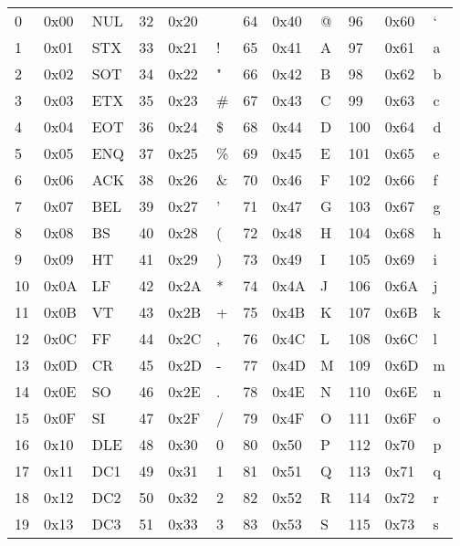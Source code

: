 \documentclass{book}
\begin{document}
{\begin{tabular}{|lll|lll|lll|lll|}
    0 &  0x00 &  NUL &   32 &  0x20 &      &   64 &  0x40 &    @ &   96 &  0x60 &    ` \\
    1 &  0x01 &  STX &   33 &  0x21 &    ! &   65 &  0x41 &    A &   97 &  0x61 &    a \\
    2 &  0x02 &  SOT &   34 &  0x22 &    " &   66 &  0x42 &    B &   98 &  0x62 &    b \\
    3 &  0x03 &  ETX &   35 &  0x23 &   \# &   67 &  0x43 &    C &   99 &  0x63 &    c \\
    4 &  0x04 &  EOT &   36 &  0x24 &   \$ &   68 &  0x44 &    D &  100 &  0x64 &    d \\
    5 &  0x05 &  ENQ &   37 &  0x25 &   \% &   69 &  0x45 &    E &  101 &  0x65 &    e \\
    6 &  0x06 &  ACK &   38 &  0x26 &   \& &   70 &  0x46 &    F &  102 &  0x66 &    f \\
    7 &  0x07 &  BEL &   39 &  0x27 &    ' &   71 &  0x47 &    G &  103 &  0x67 &    g \\
    8 &  0x08 &   BS &   40 &  0x28 &    ( &   72 &  0x48 &    H &  104 &  0x68 &    h \\
    9 &  0x09 &   HT &   41 &  0x29 &    ) &   73 &  0x49 &    I &  105 &  0x69 &    i \\
   10 &  0x0A &   LF &   42 &  0x2A &    * &   74 &  0x4A &    J &  106 &  0x6A &    j \\
   11 &  0x0B &   VT &   43 &  0x2B &    + &   75 &  0x4B &    K &  107 &  0x6B &    k \\
   12 &  0x0C &   FF &   44 &  0x2C &    , &   76 &  0x4C &    L &  108 &  0x6C &    l \\
   13 &  0x0D &   CR &   45 &  0x2D &    - &   77 &  0x4D &    M &  109 &  0x6D &    m \\
   14 &  0x0E &   SO &   46 &  0x2E &    . &   78 &  0x4E &    N &  110 &  0x6E &    n \\
   15 &  0x0F &   SI &   47 &  0x2F &    / &   79 &  0x4F &    O &  111 &  0x6F &    o \\
   16 &  0x10 &  DLE &   48 &  0x30 &    0 &   80 &  0x50 &    P &  112 &  0x70 &    p \\
   17 &  0x11 &  DC1 &   49 &  0x31 &    1 &   81 &  0x51 &    Q &  113 &  0x71 &    q \\
   18 &  0x12 &  DC2 &   50 &  0x32 &    2 &   82 &  0x52 &    R &  114 &  0x72 &    r \\
   19 &  0x13 &  DC3 &   51 &  0x33 &    3 &   83 &  0x53 &    S &  115 &  0x73 &    s \\

\end{tabular}}
\end{document}
